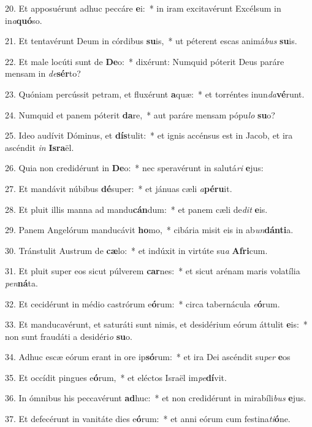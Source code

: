 20. Et apposuérunt adhuc peccáre \textbf{e}i:~*  in iram excitavérunt Excélsum in in\textit{a}\textbf{quó}so.\

21. Et tentavérunt Deum in córdibus \textbf{su}is,~*  ut péterent escas animá\textit{bus} \textbf{su}is.\

22. Et male locúti sunt de \textbf{De}o:~*  dixérunt: Numquid póterit Deus paráre mensam in \textit{de}\textbf{sér}to?\

23. Quóniam percússit petram, et fluxérunt \textbf{a}quæ:~*  et torréntes inun\textit{da}\textbf{vé}runt.\

24. Numquid et panem póterit \textbf{da}re,~*  aut paráre mensam pópu\textit{lo} \textbf{su}o?\

25. Ideo audívit Dóminus, et \textbf{dís}tulit:~*  et ignis accénsus est in Jacob, et ira ascéndit \textit{in} \textbf{Is}\textbf{ra}ël.\

26. Quia non credidérunt in \textbf{De}o:~*  nec speravérunt in salutá\textit{ri} \textbf{e}jus:\

27. Et mandávit núbibus \textbf{dé}super:~*  et jánuas cæli \textit{a}\textbf{pé}\textbf{ru}it.\

28. Et pluit illis manna ad mandu\textbf{cán}dum:~*  et panem cæli de\textit{dit} \textbf{e}is.\

29. Panem Angelórum manducávit \textbf{ho}mo,~*  cibária misit eis in ab\textit{un}\textbf{dán}\textbf{ti}a.\

30. Tránstulit Austrum de \textbf{cæ}lo:~*  et indúxit in virtúte su\textit{a} \textbf{A}\textbf{fri}cum.\

31. Et pluit super eos sicut púlverem \textbf{car}nes:~*  et sicut arénam maris volatília \textit{pen}\textbf{ná}ta.\

32. Et cecidérunt in médio castrórum e\textbf{ó}rum:~*  circa tabernácula \textit{e}\textbf{ó}rum.\

33. Et manducavérunt, et saturáti sunt nimis, et desidérium eórum áttulit \textbf{e}is:~*  non sunt fraudáti a desidéri\textit{o} \textbf{su}o.\

34. Adhuc escæ eórum erant in ore ip\textbf{só}rum:~*  et ira Dei ascéndit su\textit{per} \textbf{e}os\

35. Et occídit pingues e\textbf{ó}rum,~*  et eléctos Israël im\textit{pe}\textbf{dí}vit.\

36. In ómnibus his peccavérunt \textbf{ad}huc:~*  et non credidérunt in mirabíli\textit{bus} \textbf{e}jus.\

37. Et defecérunt in vanitáte dies e\textbf{ó}rum:~*  et anni eórum cum festina\textit{ti}\textbf{ó}ne.\

